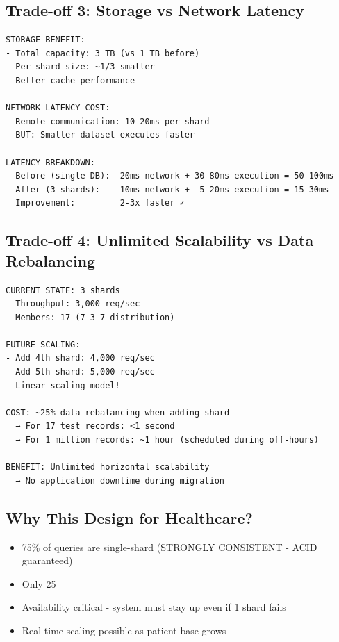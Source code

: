 \documentclass[12pt]{article}
\begin{document}
\subsection*{Trade-off 3: Storage vs Network Latency}

\begin{lstlisting}
STORAGE BENEFIT:
- Total capacity: 3 TB (vs 1 TB before)
- Per-shard size: ~1/3 smaller
- Better cache performance

NETWORK LATENCY COST:
- Remote communication: 10-20ms per shard
- BUT: Smaller dataset executes faster

LATENCY BREAKDOWN:
  Before (single DB):  20ms network + 30-80ms execution = 50-100ms
  After (3 shards):    10ms network +  5-20ms execution = 15-30ms
  Improvement:         2-3x faster ✓
\end{lstlisting}

\subsection*{Trade-off 4: Unlimited Scalability vs Data Rebalancing}

\begin{lstlisting}
CURRENT STATE: 3 shards
- Throughput: 3,000 req/sec
- Members: 17 (7-3-7 distribution)

FUTURE SCALING:
- Add 4th shard: 4,000 req/sec
- Add 5th shard: 5,000 req/sec
- Linear scaling model!

COST: ~25% data rebalancing when adding shard
  → For 17 test records: <1 second
  → For 1 million records: ~1 hour (scheduled during off-hours)

BENEFIT: Unlimited horizontal scalability
  → No application downtime during migration
\end{lstlisting}

\subsection*{Why This Design for Healthcare?}

\begin{itemize}
    \item 75\% of queries are single-shard (STRONGLY CONSISTENT - ACID guaranteed)
    \item Only 25%
    \item Availability critical - system must stay up even if 1 shard fails
    \item Real-time scaling possible as patient base grows
\end{itemize}
\end{document}
